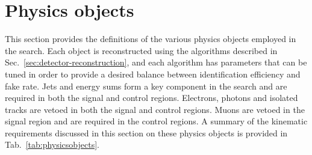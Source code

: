 \section{Physics objects}
\label{sec:analysis-physicsobjects}

This section provides the definitions of the various physics objects employed 
in the search. Each object is reconstructed using the algorithms described in 
Sec.~\ref{sec:detector-reconstruction}, and each algorithm has parameters that 
can be tuned 
in order to provide a desired balance between identification efficiency and 
fake rate. Jets and energy sums form a key component in the search and are 
required in both the signal and control regions. Electrons, photons and 
isolated tracks are vetoed in both the signal and control regions. Muons are 
vetoed in 
the signal region and are required in the control regions. A summary of the 
kinematic requirements discussed in this section on these physics objects is 
provided in 
Tab.~\ref{tab:physicsobjects}.

